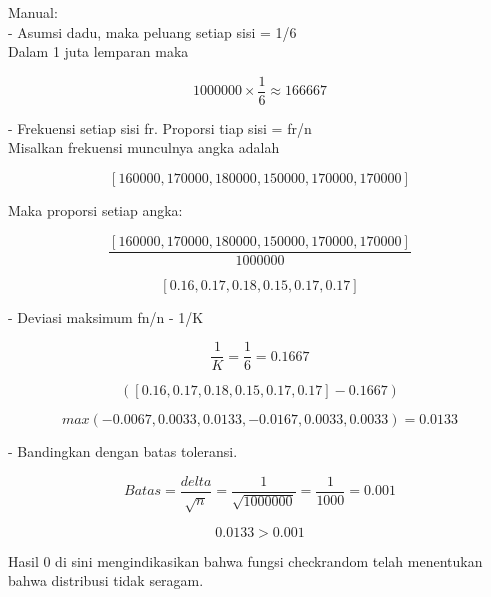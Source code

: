 \documentclass[a4paper,10pt]{article}
\begin{document}
\begin{eulernotebook}
\begin{eulercomment}
\begin{eulercomment}
\begin{eulercomment}
Manual:\\
- Asumsi dadu, maka peluang setiap sisi = 1/6\\
Dalam 1 juta lemparan maka\\
\end{eulercomment}
\begin{eulerformula}
\[
1000000 \times \frac{1}{6} \approx 166667
\]
\end{eulerformula}
\begin{eulercomment}
- Frekuensi setiap sisi fr. Proporsi tiap sisi = fr/n\\
Misalkan frekuensi munculnya angka adalah\\
\end{eulercomment}
\begin{eulerformula}
\[
[160000, 170000, 180000, 150000, 170000, 170000]
\]
\end{eulerformula}
\begin{eulercomment}
Maka proporsi setiap angka:\\
\end{eulercomment}
\begin{eulerformula}
\[
\frac{[160000, 170000, 180000, 150000, 170000, 170000]}{1000000}
\]
\end{eulerformula}
\begin{eulerformula}
\[
[0.16, 0.17, 0.18, 0.15, 0.17, 0.17]
\]
\end{eulerformula}
\begin{eulercomment}
- Deviasi maksimum fn/n - 1/K\\
\end{eulercomment}
\begin{eulerformula}
\[
\frac{1}{K} = \frac{1}{6} = 0.1667
\]
\end{eulerformula}
\begin{eulerformula}
\[
([0.16, 0.17, 0.18, 0.15, 0.17, 0.17]-0.1667)
\]
\end{eulerformula}
\begin{eulerformula}
\[
max(-0.0067, 0.0033, 0.0133, -0.0167, 0.0033, 0.0033)= 0.0133
\]
\end{eulerformula}
\begin{eulercomment}
- Bandingkan dengan batas toleransi.\\
\end{eulercomment}
\begin{eulerformula}
\[
Batas= \frac{delta}{\sqrt{n}} = \frac{1}{\sqrt{1000000}} = \frac{1}{1000} = 0.001
\]
\end{eulerformula}
\begin{eulerformula}
\[
0.0133>0.001
\]
\end{eulerformula}
\begin{eulercomment}
Hasil 0 di sini mengindikasikan bahwa fungsi checkrandom telah
menentukan bahwa distribusi tidak seragam.


\end{eulercomment}
\end{eulercomment}
\end{eulercomment}
\end{eulernotebook}
\end{document}
